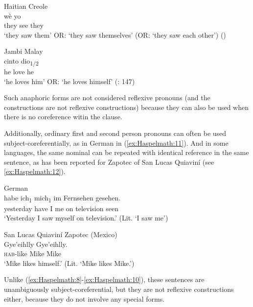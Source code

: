 \documentclass[output=paper]{langscibook}
\begin{document}
\ea Haitian Creole \label{ex:Haspelmath:9}\\
      {wè}  {yo}
\\
    they  see  they \\
    \glt ‘they saw them’ OR: ‘they saw themselves’ (OR: ‘they saw each other’) (\citealt[203]{Dechaine1994})
\z

\ea Jambi Malay\label{ex:Haspelmath:10}\\
      {cinto}  {dio\textsubscript{1/2}} \\
      he    love  he  \\
    \glt‘he loves him’ OR: ‘he loves himself’ (\citealt{Cole2015}: 147)
\z

Such anaphoric forms are not considered reflexive pronouns (and the constructions are not reflexive constructions) because they can also be used when there is no coreference witin the clause.

Additionally, ordinary first and second person pronouns can often be used subject-coreferentially, as in German in (\ref{ex:Haspelmath:11}). And in some languages, the same nominal can be repeated with identical reference in the same sentence, as has been reported for Zapotec of San Lucas Quiaviní (see \ref{ex:Haspelmath:12}).

\ea German\label{ex:Haspelmath:11} \\
     {habe}  {ich\textsubscript{1}}   {mich\textsubscript{1}}   {im}   {Fernsehen}   {gesehen.}\\
  yesterday  have  I  me  on  television  seen\\
   \glt ‘Yesterday I saw myself on television.’ (Lit. ‘I saw me’)
\z 

\ea San Lucas Quiaviní Zapotec (Mexico)\label{ex:Haspelmath:12}     \\ 
      {Gye’eihlly}  {Gye’eihlly.} \\
      \textsc{hab}{}-like   Mike   Mike   \\
    \glt‘Mike likes himself.’ (Lit. ‘Mike likes Mike.’) \citep[84]{Lee2003} 
\z


Unlike (\ref{ex:Haspelmath:8}-\ref{ex:Haspelmath:10}), these sentences are unambiguously subject-coreferential, but they are not reflexive constructions either, because they do not involve any special forms.
\end{document}
